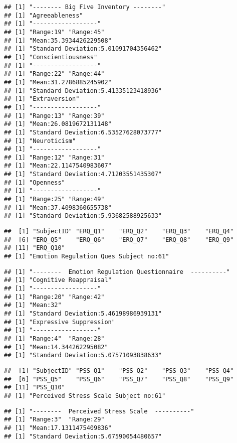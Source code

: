 \documentclass[]{article}
\begin{document}
\begin{verbatim}
## [1] "-------- Big Five Inventory --------"
## [1] "Agreeableness"
## [1] "------------------"
## [1] "Range:19" "Range:45"
## [1] "Mean:35.3934426229508"
## [1] "Standard Deviation:5.01091704356462"
## [1] "Conscientiousness"
## [1] "------------------"
## [1] "Range:22" "Range:44"
## [1] "Mean:31.2786885245902"
## [1] "Standard Deviation:5.41335123418936"
## [1] "Extraversion"
## [1] "------------------"
## [1] "Range:13" "Range:39"
## [1] "Mean:26.0819672131148"
## [1] "Standard Deviation:6.53527628073777"
## [1] "Neuroticism"
## [1] "------------------"
## [1] "Range:12" "Range:31"
## [1] "Mean:22.1147540983607"
## [1] "Standard Deviation:4.71203551435307"
## [1] "Openness"
## [1] "------------------"
## [1] "Range:25" "Range:49"
## [1] "Mean:37.4098360655738"
## [1] "Standard Deviation:5.93682588925633"
\end{verbatim}

\newpage

\begin{verbatim}
##  [1] "SubjectID" "ERQ_Q1"    "ERQ_Q2"    "ERQ_Q3"    "ERQ_Q4"   
##  [6] "ERQ_Q5"    "ERQ_Q6"    "ERQ_Q7"    "ERQ_Q8"    "ERQ_Q9"   
## [11] "ERQ_Q10"  
## [1] "Emotion Regulation Ques Subject no:61"
\end{verbatim}

\begin{verbatim}
## [1] "--------  Emotion Regulation Questionnaire  ----------"
## [1] "Cognitive Reappraisal"
## [1] "------------------"
## [1] "Range:20" "Range:42"
## [1] "Mean:32"
## [1] "Standard Deviation:5.46198986939131"
## [1] "Expressive Suppression"
## [1] "------------------"
## [1] "Range:4"  "Range:28"
## [1] "Mean:14.344262295082"
## [1] "Standard Deviation:5.07571093838633"
\end{verbatim}

\newpage

\begin{verbatim}
##  [1] "SubjectID" "PSS_Q1"    "PSS_Q2"    "PSS_Q3"    "PSS_Q4"   
##  [6] "PSS_Q5"    "PSS_Q6"    "PSS_Q7"    "PSS_Q8"    "PSS_Q9"   
## [11] "PSS_Q10"  
## [1] "Perceived Stress Scale Subject no:61"
\end{verbatim}

\begin{verbatim}
## [1] "--------  Perceived Stress Scale  ----------"
## [1] "Range:3"  "Range:29"
## [1] "Mean:17.1311475409836"
## [1] "Standard Deviation:5.67590054480657"
\end{verbatim}

\newpage
\end{document}
